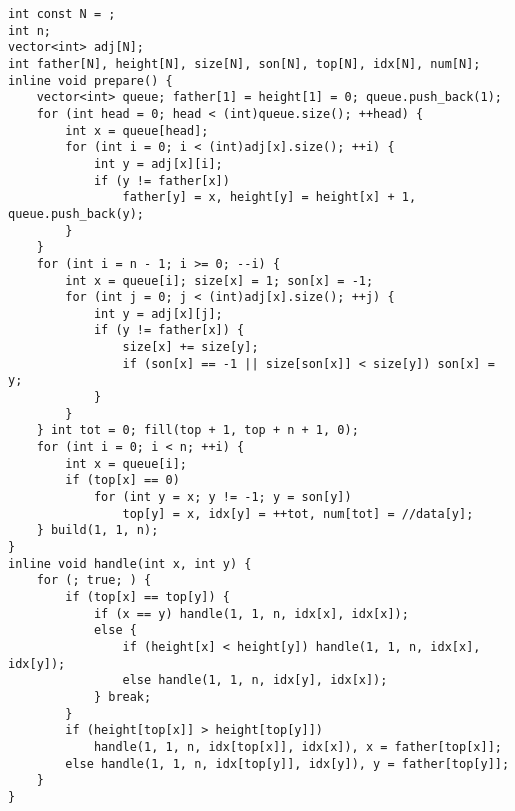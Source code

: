 \begin{lstlisting}
int const N = ;
int n;
vector<int> adj[N];
int father[N], height[N], size[N], son[N], top[N], idx[N], num[N];
inline void prepare() {
	vector<int> queue; father[1] = height[1] = 0; queue.push_back(1);
	for (int head = 0; head < (int)queue.size(); ++head) {
		int x = queue[head];
		for (int i = 0; i < (int)adj[x].size(); ++i) {
			int y = adj[x][i];
			if (y != father[x])
				father[y] = x, height[y] = height[x] + 1, queue.push_back(y);
		}
	}
	for (int i = n - 1; i >= 0; --i) {
		int x = queue[i]; size[x] = 1; son[x] = -1;
		for (int j = 0; j < (int)adj[x].size(); ++j) {
			int y = adj[x][j];
			if (y != father[x]) {
				size[x] += size[y];
				if (son[x] == -1 || size[son[x]] < size[y]) son[x] = y;
			}
		}
	} int tot = 0; fill(top + 1, top + n + 1, 0);
	for (int i = 0; i < n; ++i) {
		int x = queue[i];
		if (top[x] == 0)
			for (int y = x; y != -1; y = son[y])
				top[y] = x, idx[y] = ++tot, num[tot] = //data[y];
	} build(1, 1, n);
}
inline void handle(int x, int y) {
	for (; true; ) {
		if (top[x] == top[y]) {
			if (x == y) handle(1, 1, n, idx[x], idx[x]);
			else {
				if (height[x] < height[y]) handle(1, 1, n, idx[x], idx[y]);
				else handle(1, 1, n, idx[y], idx[x]);
			} break;
		}
		if (height[top[x]] > height[top[y]])
			handle(1, 1, n, idx[top[x]], idx[x]), x = father[top[x]];
		else handle(1, 1, n, idx[top[y]], idx[y]), y = father[top[y]];
	}
}
\end{lstlisting}